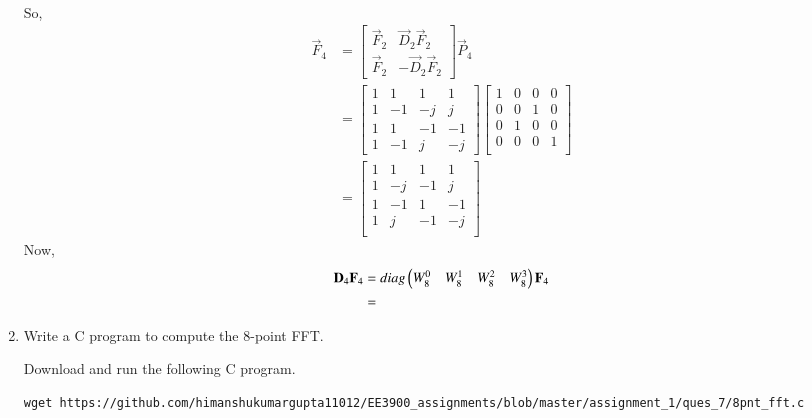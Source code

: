 \documentclass[journal,12pt,twocolumn]{IEEEtran}
\renewcommand\thesection{\arabic{section}}
\begin{document}
\begin{enumerate}[label=\arabic*.,ref=\thesection.\theenumi]
\begin{align}
\end{align}
So,
\begin{align}
	\vec{F}_4&=\begin{bmatrix}
		\vec{F}_{2}&\vec{D}_{2}\vec{F}_{2}\\
		\vec{F}_{2}&-\vec{D}_{2}\vec{F}_{2}
	\end{bmatrix}\vec{P}_4\\
&=\begin{bmatrix}
	1& 1&1& 1\\
	1&-1&-j&j\\
	1& 1&-1& -1\\
	1&-1&j&-j
\end{bmatrix}\begin{bmatrix}
1&0&0&0\\
0&0&1&0\\
0&1&0&0\\
0&0&0&1\\
\end{bmatrix}\\
&=\begin{bmatrix}
	1&1&1&1\\
	1&-j&-1&j\\
	1&-1&1&-1\\
	1&j&-1&-j\\
\end{bmatrix}
\end{align}
Now,
\begin{align}
	\mathbf{D}_{4}\mathbf{F}_{4}&=diag\begin{pmatrix}W_{8}^{0} & W_{8}^{1}&W_{8}^{2}&W_{8}^{3}\end{pmatrix}\mathbf{F}_{4}\\
	&=
\end{align}

	\item Write a C program to compute the 8-point FFT. 
	
	\solution Download and run the following C program.
	\begin{lstlisting}
wget https://github.com/himanshukumargupta11012/EE3900_assignments/blob/master/assignment_1/ques_7/8pnt_fft.c
	\end{lstlisting}
\end{enumerate}
\end{document}
